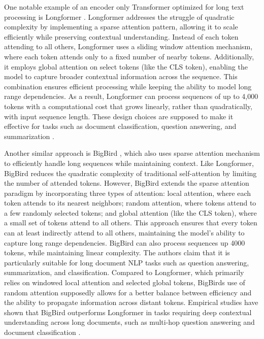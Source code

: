 One notable example of an encoder only Transformer optimized for long text processing is Longformer \cite{longformer}. 
Longformer addresses the struggle of quadratic complexity by implementing a sparse attention pattern, 
allowing it to scale efficiently while preserving contextual understanding. 
Instead of each token attending to all others, Longformer uses a sliding window attention mechanism, 
where each token attends only to a fixed number of nearby tokens. 
Additionally, it employs global attention on select tokens (like the CLS token), 
enabling the model to capture broader contextual information across the sequence. 
This combination ensures efficient processing while keeping the ability to model long range dependencies. 
As a result, Longformer can process sequences of up to 4,000 tokens with a computational cost that grows linearly, 
rather than quadratically, with input sequence length. 
These design choices are supposed to make it  effective for tasks such as document classification, 
question answering, and summarization \cite{longformer}.

Another similar approach is BigBird \cite{bigbird}, 
which also uses sparse attention mechanism to efficiently handle long sequences while maintaining context. 
Like Longformer, BigBird reduces the quadratic complexity of traditional self-attention by limiting the number of attended tokens. 
However, BigBird extends the sparse attention paradigm by incorporating three types of attention: 
local attention, where each token attends to its nearest neighbors; 
random attention, where tokens attend to a few randomly selected tokens; 
and global attention (like the CLS token), where a small set of tokens attend to all others. 
This approach ensures that every token can at least indirectly attend to all others, 
maintaining the model's ability to capture long range dependencies.
BigBird can also process sequences up 4000 tokens, while maintaining linear complexity.
The authors claim that it is particularly suitable for long document NLP tasks such as 
question answering, summarization, and classification. 
Compared to Longformer, which primarily relies on windowed local attention and selected global tokens, 
BigBirds use of random attention supposedly allows for a better balance between efficiency and 
the ability to propagate information across distant tokens. 
Empirical studies have shown that BigBird outperforms Longformer in tasks requiring deep contextual understanding across long documents, 
such as multi-hop question answering and document classification \cite{bigbird}.

